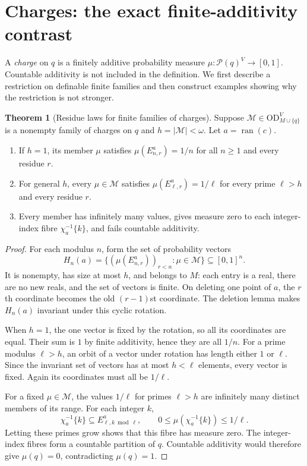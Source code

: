 \documentclass[11pt,letterpaper]{article}
\theoremstyle{definition}
\newtheorem{theorem}[definition]{Theorem}
\numberwithin{equation}{section}
\newcommand{\OD}{\mathrm{OD}}
\newcommand{\ran}{\operatorname{ran}}
\newcommand{\ODg}{\OD_{M\cup\{q\}}^{V}}
\newcommand{\powerset}{\mathcal P}
\begin{document}
\section{Charges: the exact finite-additivity contrast}\label{sec:charges}

A \emph{charge} on $q$ is a finitely additive probability measure
$\mu:\powerset(q)^V\to[0,1]$. Countable additivity is not included in the
definition. We first describe a restriction on definable finite families
and then construct examples showing why the restriction is not stronger.

\begin{theorem}[Residue laws for finite families of charges]\label{thm:charges}
Suppose $\mathcal M\in\ODg$ is a nonempty family of charges on $q$ and
$h=|\mathcal M|<\omega$. Let $a=\ran(c)$.
\begin{enumerate}
\item If $h=1$, its member $\mu$ satisfies
$\mu(E^a_{n,r})=1/n$ for all $n\ge1$ and every residue $r$.
\item For general $h$, every $\mu\in\mathcal M$ satisfies
$\mu(E^a_{\ell,r})=1/\ell$ for every prime $\ell>h$ and every residue $r$.
\item Every member has infinitely many values, gives measure zero to each
integer-index fibre $\chi_a^{-1}\{k\}$, and fails countable additivity.
\end{enumerate}
\end{theorem}

\begin{proof}
For each modulus $n$, form the set of probability vectors
\[
 H_n(a)=\{(\mu(E^a_{n,r}))_{r<n}:\mu\in\mathcal M\}\subseteq[0,1]^n.
\]
It is nonempty, has size at most $h$, and belongs to $M$: each entry is a
real, there are no new reals, and the set of vectors is finite. On deleting
one point of $a$, the $r$th coordinate becomes the old $(r-1)$st
coordinate. The deletion lemma makes $H_n(a)$ invariant under this cyclic
rotation.

When $h=1$, the one vector is fixed by the rotation, so all its coordinates
are equal. Their sum is $1$ by finite additivity, hence they are all $1/n$.
For a prime modulus $\ell>h$, an orbit of a vector under rotation has
length either $1$ or $\ell$. Since the invariant set of vectors has at
most $h<\ell$ elements, every vector is fixed. Again its coordinates must
all be $1/\ell$.

For a fixed $\mu\in\mathcal M$, the values $1/\ell$ for primes $\ell>h$
are infinitely many distinct members of its range. For each integer $k$,
\[
 \chi_a^{-1}\{k\}\subseteq E^a_{\ell,k\bmod\ell},
 \qquad
 0\le\mu(\chi_a^{-1}\{k\})\le1/\ell.
\]
Letting these primes grow shows that this fibre has measure zero. The
integer-index fibres form a countable partition of $q$. Countable
additivity would therefore give $\mu(q)=0$, contradicting $\mu(q)=1$.
\end{proof}
\end{document}
